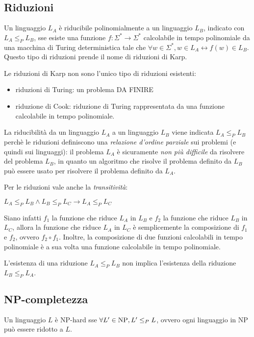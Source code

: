 \subsection*{Riduzioni}
\begin{defn}
    Un linguaggio $L_A$ è riducibile polinomialmente a un linguaggio $L_B$, indicato con $L_A \le_{P} L_B$, sse esiste una funzione $f: \Sigma^* \rightarrow \Sigma^*$ calcolabile in tempo polinomiale da una macchina di Turing deterministica tale che $\forall w \in \Sigma^*, w \in L_A \leftrightarrow f(w) \in L_B$. Questo tipo di riduzioni prende il nome di riduzioni di Karp.
\end{defn}
Le riduzioni di Karp non sono l'unico tipo di riduzioni esistenti:
\begin{itemize}
    \item riduzioni di Turing: un problema DA FINIRE 
    \item riduzione di Cook: riduzione di Turing rappresentata da una funzione calcolabile in tempo polinomiale.
\end{itemize}
La riducibilità da un linguaggio $L_A$ a un linguaggio $L_B$ viene indicata $L_A \le_{P} L_B$ perchè le riduzioni definiscono una \textit{relazione d'ordine parziale} sui problemi (e quindi sui linguaggi): il problema $L_A$ è sicuramente \textit{non più difficile} da risolvere del problema $L_B$, in quanto un algoritmo che risolve il problema definito da $L_B$ può essere usato per risolvere il problema definito da $L_A$.

Per le riduzioni vale anche la \textit{transitività}: 
\begin{center}
    $L_A \le_P L_B \land L_B \le_P L_C \rightarrow L_A \le_P L_C$
\end{center}
Siano infatti $f_1$ la funzione che riduce $L_A$ in $L_B$ e $f_2$ la funzione che riduce $L_B$ in $L_C$, allora la funzione che riduce $L_A$ in $L_C$ è semplicemente la composizione di $f_1$ e $f_2$, ovvero $f_2 \circ f_1$. Inoltre, la composizione di due funzioni calcolabili in tempo polinomiale è a sua volta una funzione calcolabile in tempo polinomiale.

\begin{rem}
    L'esistenza di una riduzione $L_A \le_P L_B$ non implica l'esistenza della riduzione $L_B \le_P L_A$.
\end{rem}

\subsection*{NP-completezza}
\begin{defn}
    Un linguaggio $L$ è NP-hard sse $\forall L' \in \textnormal{NP}, L' \le_P L$, ovvero ogni linguaggio in NP può essere ridotto a $L$.
\end{defn}

